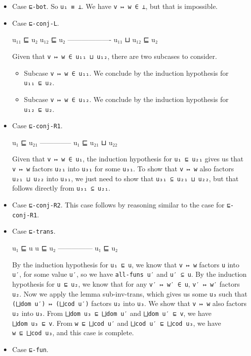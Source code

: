 \begin{itemize}
\item
  Case \texttt{⊑-bot}. So \texttt{u₁\ ≡\ ⊥}. We have
  \texttt{v\ ↦\ w\ ∈\ ⊥}, but that is impossible.
\item
  Case \texttt{⊑-conj-L}.

  \begin{myDisplay}
    u₁₁ ⊑ u₂   u₁₂ ⊑ u₂
    -------------------
    u₁₁ ⊔ u₁₂ ⊑ u₂
  \end{myDisplay}

  Given that \texttt{v\ ↦\ w\ ∈\ u₁₁\ ⊔\ u₁₂}, there are two subcases to
  consider.

  \begin{itemize}
  \item
    Subcase \texttt{v\ ↦\ w\ ∈\ u₁₁}. We conclude by the induction
    hypothesis for \texttt{u₁₁\ ⊑\ u₂}.
  \item
    Subcase \texttt{v\ ↦\ w\ ∈\ u₁₂}. We conclude by the induction
    hypothesis for \texttt{u₁₂\ ⊑\ u₂}.
  \end{itemize}
\item
  Case \texttt{⊑-conj-R1}.

  \begin{myDisplay}
    u₁ ⊑ u₂₁
    --------------
    u₁ ⊑ u₂₁ ⊔ u₂₂
  \end{myDisplay}

  Given that \texttt{v\ ↦\ w\ ∈\ u₁}, the induction hypothesis for
  \texttt{u₁\ ⊑\ u₂₁} gives us that \texttt{v\ ↦\ w} factors
  \texttt{u₂₁} into \texttt{u₃₁} for some \texttt{u₃₁}. To show that
  \texttt{v\ ↦\ w} also factors \texttt{u₂₁\ ⊔\ u₂₂} into \texttt{u₃₁},
  we just need to show that \texttt{u₃₁\ ⊆\ u₂₁\ ⊔\ u₂₂}, but that
  follows directly from \texttt{u₃₁\ ⊆\ u₂₁}.
\item
  Case \texttt{⊑-conj-R2}. This case follows by reasoning similar to the
  case for \texttt{⊑-conj-R1}.
\item
  Case \texttt{⊑-trans}.

  \begin{myDisplay}
    u₁ ⊑ u   u ⊑ u₂
    ---------------
        u₁ ⊑ u₂
  \end{myDisplay}

  By the induction hypothesis for \texttt{u₁\ ⊑\ u}, we know that
  \texttt{v\ ↦\ w} factors \texttt{u} into \texttt{u′}, for some value
  \texttt{u′}, so we have \texttt{all-funs\ u′} and \texttt{u′\ ⊆\ u}.
  By the induction hypothesis for \texttt{u\ ⊑\ u₂}, we know that for
  any \texttt{v′\ ↦\ w′\ ∈\ u}, \texttt{v′\ ↦\ w′} factors \texttt{u₂}.
  Now we apply the lemma sub-inv-trans, which gives us some \texttt{u₃}
  such that \texttt{(⨆dom\ u′)\ ↦\ (⨆cod\ u′)} factors \texttt{u₂} into
  \texttt{u₃}. We show that \texttt{v\ ↦\ w} also factors \texttt{u₂}
  into \texttt{u₃}. From \texttt{⨆dom\ u₃\ ⊑\ ⨆dom\ u′} and
  \texttt{⨆dom\ u′\ ⊑\ v}, we have \texttt{⨆dom\ u₃\ ⊑\ v}. From
  \texttt{w\ ⊑\ ⨆cod\ u′} and \texttt{⨆cod\ u′\ ⊑\ ⨆cod\ u₃}, we have
  \texttt{w\ ⊑\ ⨆cod\ u₃}, and this case is complete.
\item
  Case \texttt{⊑-fun}.


\end{itemize}
